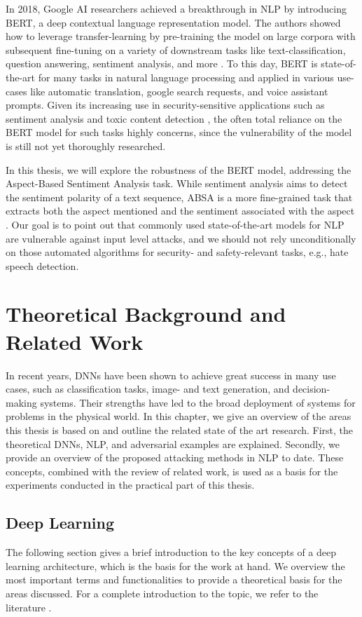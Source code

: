 In 2018, Google AI researchers achieved a breakthrough in NLP by introducing BERT, a deep contextual language representation model. The authors showed how to leverage transfer-learning by pre-training the model on large corpora with subsequent fine-tuning on a variety of downstream tasks like text-classification, question answering, sentiment analysis, and more \cite{devlin2018bert}. To this day, BERT is state-of-the-art for many tasks in natural language processing and applied in various use-cases like automatic translation, google search requests, and voice assistant prompts. 
Given its increasing use in security-sensitive applications such as sentiment analysis \cite{prabowo2009sentiment} and toxic content detection \cite{singhania20173han}, the often total reliance on the BERT model for such tasks highly concerns, since the vulnerability of the model is still not yet thoroughly researched.

In this thesis, we will explore the robustness of the BERT model, addressing the Aspect-Based Sentiment Analysis task. While sentiment analysis aims to detect the sentiment polarity of a text sequence, ABSA is a more fine-grained task that extracts both the aspect mentioned and the sentiment associated with the aspect \cite{pavlopoulos2014aspect}.
Our goal is to point out that commonly used state-of-the-art models for NLP are vulnerable against input level attacks, and we should not rely unconditionally on those automated algorithms for security- and safety-relevant tasks, e.g., hate speech detection.
\newpage

\section{Theoretical Background and Related Work}

In recent years, DNNs have been shown to achieve great success in many use cases, such as classification tasks, image- and text generation, and decision-making systems. Their strengths have led to the broad deployment of systems for problems in the physical world. 
In this chapter, we give an overview of the areas this thesis is based on and outline the related state of the art research. First, the theoretical DNNs, NLP, and adversarial examples are explained. Secondly, we provide an overview of the proposed attacking methods in NLP to date. These concepts, combined with the review of related work, is used as a basis for the experiments conducted in the practical part of this thesis. 
\subsection{Deep Learning}
The following section gives a brief introduction to the key concepts of a deep learning architecture, which is the basis for the work at hand. We overview the most important terms and functionalities to provide a theoretical basis for the areas discussed. For a complete introduction to the topic, we refer to the literature \cite{bengio2017deep}.

